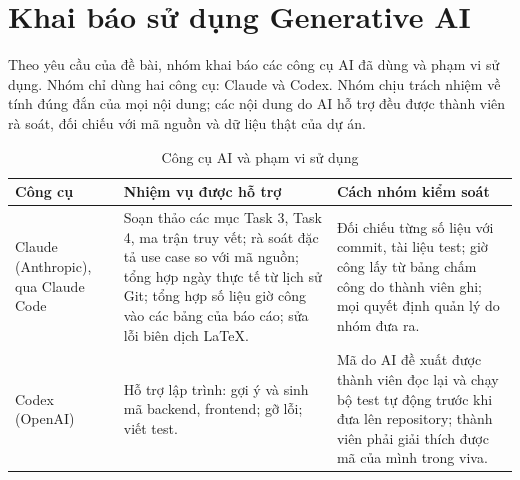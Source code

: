 \section{Khai báo sử dụng Generative AI}
\label{sec:ai-declaration}

Theo yêu cầu của đề bài, nhóm khai báo các công cụ AI đã dùng và phạm vi sử dụng. Nhóm chỉ dùng hai công cụ: Claude và Codex. Nhóm chịu trách nhiệm về tính đúng đắn của mọi nội dung; các nội dung do AI hỗ trợ đều được thành viên rà soát, đối chiếu với mã nguồn và dữ liệu thật của dự án.

\begin{table}[H]
\centering\small
\caption{Công cụ AI và phạm vi sử dụng}\label{tab:ai}
\begin{tabularx}{\linewidth}{@{}p{.20\linewidth}Xp{.25\linewidth}@{}}
\toprule
\textbf{Công cụ} & \textbf{Nhiệm vụ được hỗ trợ} & \textbf{Cách nhóm kiểm soát}\\\midrule
Claude (Anthropic), qua Claude Code & Soạn thảo các mục Task 3, Task 4, ma trận truy vết; rà soát đặc tả use case so với mã nguồn; tổng hợp ngày thực tế từ lịch sử Git; tổng hợp số liệu giờ công vào các bảng của báo cáo; sửa lỗi biên dịch LaTeX. & Đối chiếu từng số liệu với commit, tài liệu test; giờ công lấy từ bảng chấm công do thành viên ghi; mọi quyết định quản lý do nhóm đưa ra.\\
Codex (OpenAI) & Hỗ trợ lập trình: gợi ý và sinh mã backend, frontend; gỡ lỗi; viết test. & Mã do AI đề xuất được thành viên đọc lại và chạy bộ test tự động trước khi đưa lên repository; thành viên phải giải thích được mã của mình trong viva.\\
\bottomrule
\end{tabularx}
\end{table}
